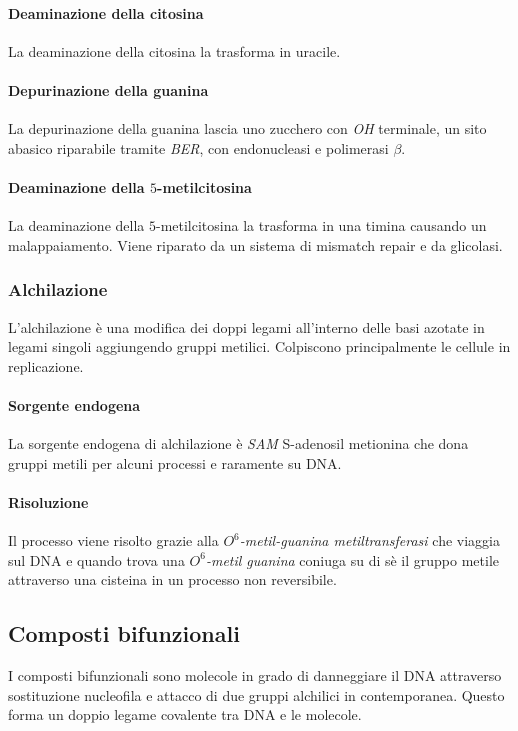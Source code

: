 			\paragraph{Deaminazione della citosina}
			La deaminazione della citosina la trasforma in uracile.

			\paragraph{Depurinazione della guanina}
			La depurinazione della guanina lascia uno zucchero con \emph{OH} terminale, un sito abasico riparabile tramite \emph{BER}, con endonucleasi e polimerasi $\beta$.

			\paragraph{Deaminazione della $5$-metilcitosina}
			La deaminazione della $5$-metilcitosina la trasforma in una timina causando un malappaiamento.
			Viene riparato da un sistema di mismatch repair e da glicolasi.

		\subsubsection{Alchilazione}
		L'alchilazione \`e una modifica dei doppi legami all'interno delle basi azotate in legami singoli aggiungendo gruppi metilici.
		Colpiscono principalmente le cellule in replicazione.

			\paragraph{Sorgente endogena}
			La sorgente endogena di alchilazione \`e \emph{SAM} S-adenosil metionina che dona gruppi metili per alcuni processi e raramente su DNA.

			\paragraph{Risoluzione}
			Il processo viene risolto grazie alla \emph{$O^6$-metil-guanina metiltransferasi} che viaggia sul DNA e quando trova una \emph{$O^6$-metil guanina} coniuga su di s\`e il gruppo metile attraverso una cisteina in un processo non reversibile.

	\subsection{Composti bifunzionali}
	I composti bifunzionali sono molecole in grado di danneggiare il DNA attraverso sostituzione nucleofila e attacco di due gruppi alchilici in contemporanea.
	Questo forma un doppio legame covalente tra DNA e le molecole.


